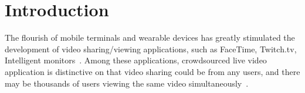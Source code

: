 
\section{Introduction}
\label{sec:introduction}

The flourish of mobile terminals and wearable devices has greatly stimulated the development of video sharing/viewing applications, such as FaceTime, Twitch.tv, Intelligent monitors~\cite{ishimaru2014blink}. Among these applications, crowdsourced live video application is distinctive on that video sharing could be from any users, and there may be thousands of users viewing the same video simultaneously~\cite{Xu2012skype}. %



 


